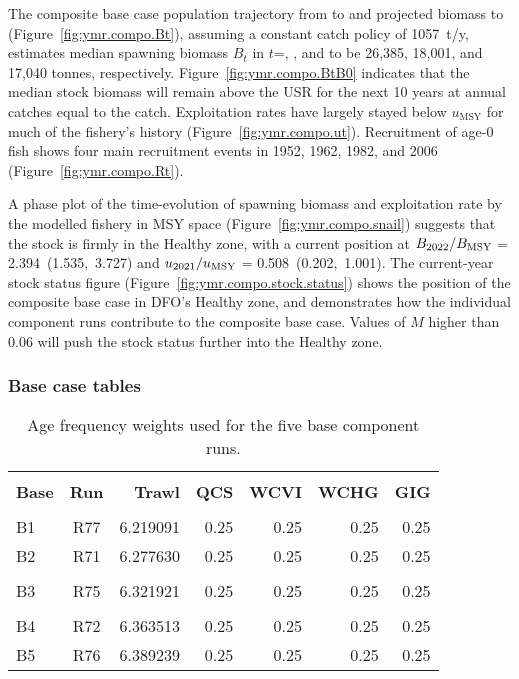 \documentclass[11pt]{book}
\newcommand{\Bmsy}{B_\text{MSY}}
\newcommand{\umsy}{u_\text{MSY}}
\begin{document}
The composite base case population trajectory from \startYear{} to \currYear{} and projected biomass to \projYear{} (Figure~\ref{fig:ymr.compo.Bt}), assuming a constant catch policy of 1057~t/y, estimates median spawning biomass $B_t$ in $t$=\startYear, \currYear, and \projYear{} to be 26,385, 18,001, and 17,040 tonnes, respectively.
Figure~\ref{fig:ymr.compo.BtB0} indicates that the median stock biomass will remain above the USR for the next 10 years at annual catches equal to the \currYear{} catch.
Exploitation rates have largely stayed below $\umsy$ for much of the fishery's history (Figure~\ref{fig:ymr.compo.ut}).
Recruitment of age-0 fish shows four main recruitment events in 1952, 1962, 1982, and 2006 (Figure~\ref{fig:ymr.compo.Rt}).

A phase plot of the time-evolution of spawning biomass and exploitation rate by the modelled fishery in MSY space (Figure~\ref{fig:ymr.compo.snail}) suggests that the stock is firmly in the Healthy zone, with a current position at $B_{\currYear}/\Bmsy$ = 2.394~(1.535,~3.727)
and $u_{\prevYear}/\umsy$ = 0.508~(0.202,~1.001).
The current-year stock status figure (Figure~\ref{fig:ymr.compo.stock.status}) shows the position of the composite base case in DFO's Healthy zone, and demonstrates how the individual component runs contribute to the composite base case.
Values of $M$ higher than 0.06 will push the stock status further into the Healthy zone.

\clearpage

\subsubsection{Base case tables}

\setlength{\tabcolsep}{6pt}
\begin{table}[!h]
\centering
\caption{Age frequency weights used for the five base component runs.}
\label{tab:baseAFwts}
\usefont{\encodingdefault}{\familydefault}{\seriesdefault}{\shapedefault}\small
\begin{tabular}{lcrrrrr}
\hline \\ [-1.5ex]
{\bf Base} & {\bf Run} & {\bf Trawl} & {\bf QCS} & {\bf WCVI} & {\bf WCHG} & {\bf GIG} \\ [0.2ex]
\hline \\ [-1.5ex]
B1 & R77 & 6.219091 & 0.25 & 0.25 & 0.25 & 0.25 \\
B2 & R71 & 6.277630 & 0.25 & 0.25 & 0.25 & 0.25 \\
\hdashline \\ [-1.75ex]
B3 & R75 & 6.321921 & 0.25 & 0.25 & 0.25 & 0.25 \\
\hdashline \\ [-1.5ex]
B4 & R72 & 6.363513 & 0.25 & 0.25 & 0.25 & 0.25 \\
B5 & R76 & 6.389239 & 0.25 & 0.25 & 0.25 & 0.25 \\
\hline
\end{tabular}
\usefont{\encodingdefault}{\familydefault}{\seriesdefault}{\shapedefault}\normalsize
\end{table}
\end{document}
